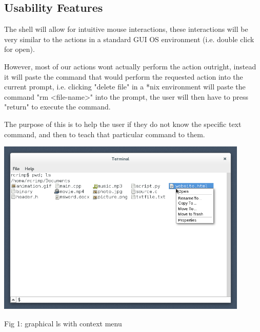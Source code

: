 \documentclass[a4paper,11pt]{article}
\begin{document}


\subsection*{Usability Features}
The shell will allow for intuitive mouse interactions, these interactions will be very similar to the actions in a standard GUI OS environment (i.e. double click for open).

However, most of our actions wont actually perform the action outright, instead it will paste the command that would perform the requested action into the current prompt, i.e. clicking "delete file" in a *nix environment will paste the command "rm \textless file-name\textgreater" into the prompt, the user will then have to press "return" to execute the command.

The purpose of this is to help the user if they do not know the specific text command, and then to teach that particular command to them.


\begin{center}\includegraphics[width=12cm]{context.png}

Fig 1: graphical ls with context menu\end{center}
\end{document}
